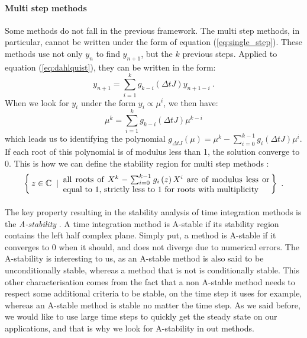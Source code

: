         \paragraph{Multi step methods}
        Some methods do not fall in the previous framework.
        The multi step methods, in particular, cannot be written under the form of equation (\ref{eq:single_step}).
        These methods use not only $y_n$ to find $y_{n+1}$, but the $k$ previous steps.
        Applied to equation (\ref{eq:dahlquist}), they can be written in the form:
        \begin{equation}
          y_{n+1} = \sum_{i=1}^k g_{k-i}\left(\Delta t J\right) y_{n+1-i} \ .
        \end{equation}
        When we look for $y_i$ under the form $y_i \propto \mu^{i}$, we then have:
        \begin{equation}
          \mu^k = \sum_{i=1}^k g_{k-i}\left(\Delta t J\right) \mu^{k-i}
        \end{equation}
        which leads us to identifying the polynomial $g_{\Delta t J}\left(\mu\right) = \mu^k - \sum_{i=0}^{k-1}g_i\left(\Delta t J\right)\mu^i$.
        If each root of this polynomial is of modulus less than 1, the solution converge to 0.
        This is how we can define the stability region for multi step methods \cite{HairerWanner1996}:
        \begin{equation}
          \left\{ \, z \in \mathbb{C} \; \mid \; \parbox{25em}{all roots of $X^k - \sum_{i=0}^{k-1}g_i\left(z\right)X^i$ are of modulus less or equal to 1, strictly less to 1 for roots with multiplicity}
           \, \right \} \ .
        \end{equation}

        \paragraph{}
        The key property resulting in the stability analysis of time integration methods is the \emph{A-stability} \cite{Dahlquist1963}.
        A time integration method is A-stable if its stability region contains the left half complex plane.
        Simply put, a method is A-stable if it converges to 0 when it should, and does not diverge due to numerical errors.
        The A-stability is interesting to us, as an A-stable method is also said to be unconditionally stable, whereas a method that is not is conditionally stable.
        This other characterisation comes from the fact that a non A-stable method needs to respect some additional criteria to be stable, on the time step it uses for example, whereas an A-stable method is stable no matter the time step.
        As we said before, we would like to use large time steps to quickly get the steady state on our applications, and that is why  we look for A-stability in out methods.


